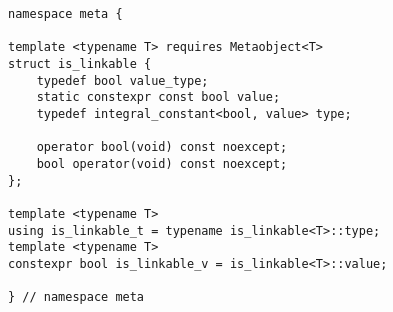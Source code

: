 
\begin{verbatim}
namespace meta {

template <typename T> requires Metaobject<T>
struct is_linkable {
	typedef bool value_type;
	static constexpr const bool value;
	typedef integral_constant<bool, value> type;

	operator bool(void) const noexcept;
	bool operator(void) const noexcept;
};

template <typename T>
using is_linkable_t = typename is_linkable<T>::type;
template <typename T>
constexpr bool is_linkable_v = is_linkable<T>::value;

} // namespace meta
\end{verbatim}

